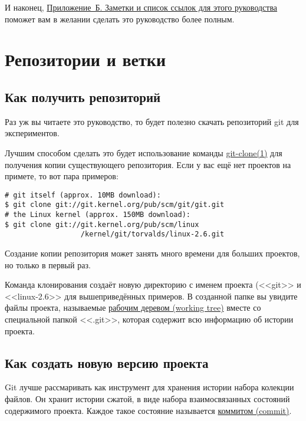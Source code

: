 \documentclass[a4paper, 12pt]{report}
\begin{document}
И наконец, \href{#appendixb}{Приложение~Б. Заметки и список ссылок для этого
руководства} поможет вам в желании сделать это руководство более
полным.
%
%
\chapter{Репозитории и ветки}
\hypertarget{#chapter1}{}

\section{Как получить репозиторий}

Раз уж вы читаете это руководство, то будет полезно скачать репозиторий git для 
экспериментов.

Лучшим способом сделать это будет использование команды
\href{http://www.kernel.org/pub/software/scm/git/docs/git-clone.html}{git-clone(1)}
для получения копии существующего репозитория. Если у вас ещё нет проектов на 
примете, то вот пара примеров:

\begin{lstlisting}
# git itself (approx. 10MB download):
$ git clone git://git.kernel.org/pub/scm/git/git.git
# the Linux kernel (approx. 150MB download):
$ git clone git://git.kernel.org/pub/scm/linux
                  /kernel/git/torvalds/linux-2.6.git
\end{lstlisting}

Создание копии репозитория может занять много времени для больших проектов, но 
только в первый раз.

Команда клонирования создаёт новую директорию с именем проекта (<<git>> и <<linux-2.6>>
для вышеприведённых примеров. В созданной папке вы увидите файлы проекта, называемые
\href{#def_working_tree}{рабочим деревом (working tree)} вместе со специальной папкой 
<<.git>>, которая содержит всю информацию об истории проекта.



\section{Как создать новую версию проекта}

Git лучше рассмаривать как инструмент для хранения истории набора колекции файлов.
Он хранит истории сжатой, в виде набора взаимосвязанных состояний содержимого
проекта. Каждое такое состояние называется \href{#def_commit}{коммитом (commit)}.
\end{document}
